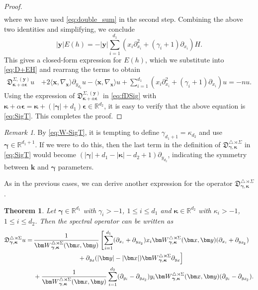 \documentclass{amsart}
\newtheorem{thm}{Theorem}[section]
\theoremstyle{remark}
\newtheorem{rem}{Remark}[section]\newtheorem*{notation}{Notation}
\def\la{{\langle}}
\def\ra{{\rangle}}
\def\fD{{\mathfrak D}}
\def\g{{\gamma}}
\def\k{{\kappa}}
\def\la{{\langle}}
\def\ra{{\rangle}}
\def\kb{{\bm k}}
\def\xb{{\bm x}}
\def\yb{{\bm y}}
\def\Wb{{\bm W}}
\def\RR{{\mathbb R}}
\def\bep{{\boldsymbol{\epsilon}}}
\def\bg{{\boldsymbol{\gamma}}}
\def\bk{{\boldsymbol{\kappa}}}
\begin{document}
\begin{proof}
\begin{align*}
\end{align*}
where we have used \eqref{eq:double_sum}
 in the second step. Combining the above two identities and simplifying, we conclude 
$$
  |\yb| E(h) = - |\yb| \sum_{i=1}^{d_1} \left( x_i \partial_{x_i}^2 + (\g_i+1) \partial_{x_i} \right)H. 
$$
This gives a closed-form expression for $E(h)$, which we substitute into \eqref{eq:D+EH} and rearrang the terms to obtain 
\begin{align*}
  \fD_{\bk+ \alpha \bep}^{\Sigma, (\yb)} u \, & +  2\la \xb,\nabla_\xb\ra \partial_{y_{d_2}} u - \la \xb,\nabla_{\xb} \ra u +
  \sum_{i=1}^{d_1} \left( x_i \partial_{x_i}^2 + (\g_i+1) \partial_{x_i} \right) u =  -n u.   
\end{align*}
Using the expression of $\fD_{\bk+ \alpha \bep}^{\Sigma, (\yb)}$ in \eqref{eq:fDSig} with $\bk+ \alpha \bep = \bk+(|\bg|+d_1) \bep
 \in \RR^{d_2}$, it is easy to verify that the above equation is \eqref{eq:SigT}. This completes the proof. 
\end{proof}

\begin{rem}
By \eqref{eq:W-SigT}, it is tempting to define $\g_{d_1+1} = \k_{d_2}$ and use $\bg \in \RR^{d_1+1}$. If we were to do this, then
the last term in the definition of $\fD_{\bg,\bk}^{\triangle \rtimes \Sigma}$ in \eqref{eq:SigT} would become 
$(|\bg| +d_1 - |\bk| - d_2 +1) \partial_{y_{d_2}}$, indicating the symmetry between $\kb$ and $\bg$ parameters. 
\end{rem}

As in the previous cases, we can derive another expression for the operator $\fD_{\bg,\bk}^{\triangle \rtimes \Sigma}$.

\begin{thm}
Let $\bg \in \RR^{d_1}$ with $\g_i  > -1$, $1\le i \le d_1$ and $\bk \in \RR^{d_2}$ with $\k_i > -1$, $1 \le i \le d_2$. Then
the spectral operator can be written as 
\begin{align} \label{eq:SigT2}
  \fD_{\bg,\bk}^{\triangle \rtimes \Sigma} u = \,  &
  \frac{1}{\Wb_{\bg,\bk}^{\triangle \rtimes \Sigma} (\xb,\yb)} \left[  \sum_{i=1}^{d_1} 
     (\partial_{x_i}+ \partial_{y_{d_2}} )  x_i \Wb_{\bg,\bk}^{\triangle \rtimes \Sigma} (\xb,\yb) (\partial_{x_i}+ \partial_{y_{d_2}}) \right.  \\
       & \qquad\qquad\qquad \quad + \partial_{y_d} (|\yb|- |\xb|)  \Wb_{\bg,\bk}^{\triangle \rtimes \Sigma} \partial_{y_d}\Big] \notag \\
  & + \frac{1}{\Wb_{\bg,\bk}^{\triangle \rtimes \Sigma} (\xb,\yb)} \sum_{i=1}^{d_2} (\partial_{y_i} - \partial_{y_{d_2}}) 
       y_i  \Wb_{\bg,\bk}^{\triangle \rtimes \Sigma} (\xb,\yb)  (\partial_{y_i} - \partial_{y_{d_2}}). \notag 
   \end{align}
\end{thm}
\end{document}
